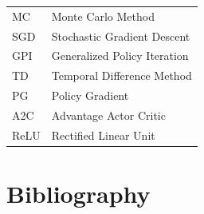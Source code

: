 \documentclass[12pt]{extarticle}
\numberwithin{equation}{section}
\begin{document}
\begin{table}[H]
\begin{tabular}{ll}
		MC                                 & Monte Carlo Method                \\
		SGD                                & Stochastic Gradient Descent       \\
		GPI                                & Generalized Policy Iteration      \\
		TD                                 & Temporal Difference Method        \\
		PG                                 & Policy Gradient                   \\
		A2C                                & Advantage Actor Critic            \\
		ReLU                               & Rectified Linear Unit            
	\end{tabular}
\end{table}
\clearpage
	\section[References]{Bibliography}
	
	
	
\end{document}
